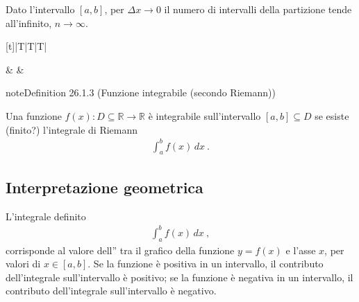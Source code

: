 \documentclass[letterpaper,10pt,italian]{jupyterBook}
\begin{document}
\sphinxAtStartPar
{} Dato l’intervallo \([a,b]\), per \(\Delta x \rightarrow 0\) il numero di intervalli della partizione tende all’infinito, \(n \rightarrow \infty\).


\begin{savenotes}\sphinxattablestart
\centering
\begin{tabulary}{\linewidth}[t]{|T|T|T|}
\hline

\sphinxAtStartPar
{}
&
\sphinxAtStartPar
{}
&
\sphinxAtStartPar
{}
\\
\hline
\end{tabulary}
\par
\sphinxattableend\end{savenotes}
\label{ch/infinitesimal_calculus/integrals:infinitesimal-calculus:integrals:def:integrable-function}
\begin{sphinxadmonition}{note}{Definition 26.1.3 (Funzione integrabile (secondo Riemann))}



\sphinxAtStartPar
Una funzione \(f(x): D \subseteq \mathbb{R} \rightarrow \mathbb{R}\) è integrabile sull’intervallo \([a,b] \subseteq D\) se esiste (finito?) l’integrale di Riemann
\begin{equation*}
\begin{split}\int_{a}^{b} f(x) \, dx \ .\end{split}
\end{equation*}\end{sphinxadmonition}


\subsection{Interpretazione geometrica}
\label{\detokenize{ch/infinitesimal_calculus/integrals:interpretazione-geometrica}}\label{\detokenize{ch/infinitesimal_calculus/integrals:infinitesimal-calculus-integrals-def-geom}}
\sphinxAtStartPar
L’integrale definito
\begin{equation*}
\begin{split}\int_{a}^{b} f(x) \, dx \ ,\end{split}
\end{equation*}
\sphinxAtStartPar
corrisponde al valore dell” tra il grafico della funzione \(y=f(x)\) e l’asse \(x\), per valori di \(x \in [a,b]\). Se la funzione è positiva in un intervallo, il contributo dell’integrale sull’intervallo è positivo; se la funzione è negativa in un intervallo, il contributo dell’integrale sull’intervallo è negativo.
\end{document}
